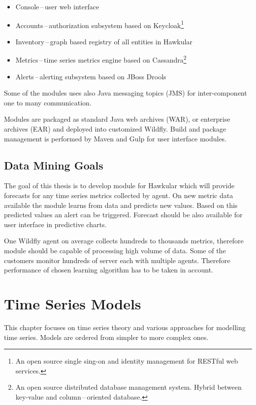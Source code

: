     \begin{itemize}
        \item Console\,--\,user web interface
        \item Accounts\,--\,authorization subsystem based on Keycloak\footnote{An open
            source single sing-on and identity management for RESTful web services.}
        \item Inventory\,--\,graph based registry of all entities in Hawkular
        \item Metrics\,--\,time series metrics engine based on Cassandra\footnote{An open
            source distributed database management system. Hybrid between key-value and
        column\,--\,oriented database.}
        \item Alerts\,--\,alerting subsystem based on JBoss Drools
    \end{itemize}

    Some of the modules uses also Java messaging topics (JMS) for inter-component
    one to many communication.

    Modules are packaged as standard Java web archives (WAR), or enterprise archives (EAR)
    and deployed into customized Wildfly. Build and package management is performed by 
    Maven and Gulp for user interface modules. 

    \section{Data Mining Goals}
    The goal of this thesis is to develop module for Hawkular which will provide forecasts for any 
    time series metrics collected by agent. On new metric data available the module
    learns from data and predicts new values. Based on this predicted values an alert can
    be triggered. Forecast should be also available for user interface in predictive
    charts. 

    One Wildfly agent on average collects hundreds to thousands metrics, therefore module
    should be capable of processing high volume of data. Some of the customers monitor
    hundreds of server each with multiple agents. Therefore performance of chosen 
    learning algorithm has to be taken in account.

\chapter{Time Series Models} \label{models}
This chapter focuses on time series theory and various approaches for modelling time series.
Models are ordered from simpler to more complex ones. 

